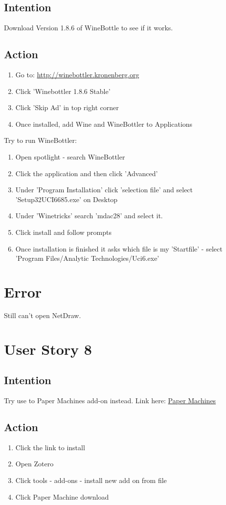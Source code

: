 \documentclass{article}
\begin{document}
\subsection{Intention}
Download Version 1.8.6 of WineBottle to see if it works.

\subsection{Action}
\begin{enumerate}
    \item Go to: \href{http://winebottler.kronenberg.org}{http://winebottler.kronenberg.org}
    \item Click 'Winebottler 1.8.6 Stable'
    \item Click 'Skip Ad' in top right corner 
    \item Once installed, add Wine and WineBottler to Applications
\end{enumerate}
Try to run WineBottler:
\begin{enumerate}
    \item Open spotlight - search WineBottler 
    \item Click the application and then click 'Advanced' 
    \item Under 'Program Installation' click 'selection file' and select 'Setup32UCI6685.exe' on Desktop
    \item Under 'Winetricks' search 'mdac28' and select it.
    \item Click install and follow prompts
    \item Once installation is finished it asks which file is my 'Startfile' - select 'Program Files/Analytic Technologies/Uci6.exe'
\end{enumerate}
\section{Error}
Still can't open NetDraw.

\section{User Story 8}
\subsection{Intention}
Try use to Paper Machines add-on instead. Link here: \href{http://papermachines.org/install/}{Paper Machines}

\subsection{Action}
\begin{enumerate}
    \item Click the link to install 
    \item Open Zotero
    \item Click tools - add-ons - install new add on from file 
    \item Click Paper Machine download
\end{enumerate}
\end{document}
